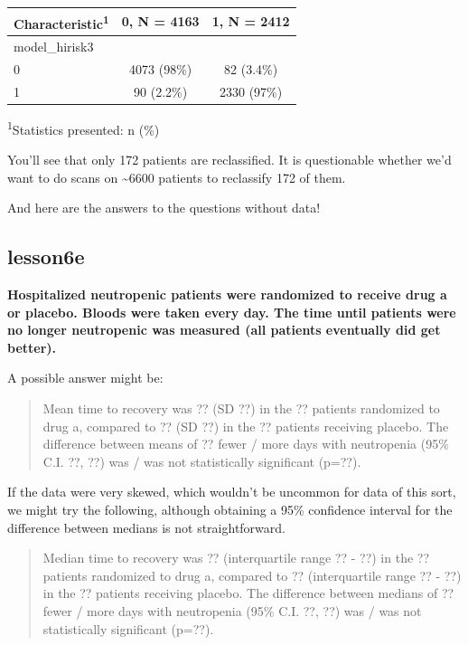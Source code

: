 \documentclass[]{book}
\begin{document}
\captionsetup[table]{labelformat=empty,skip=1pt}
\begin{longtable}{lcc}
\toprule
\textbf{Characteristic}\textsuperscript{1} & \textbf{0}, N = 4163 & \textbf{1}, N = 2412 \\ 
\midrule
model\_hirisk3 &  &  \\ 
0 & 4073 (98\%) & 82 (3.4\%) \\ 
1 & 90 (2.2\%) & 2330 (97\%) \\ 
\bottomrule
\end{longtable}
\vspace{-5mm}
\begin{minipage}{\linewidth}
\textsuperscript{1}Statistics presented: n (\%) \\ 
\end{minipage}

You'll see that only 172 patients are reclassified. It is questionable
whether we'd want to do scans on \textasciitilde6600 patients to
reclassify 172 of them.

And here are the answers to the questions without data!

\hypertarget{lesson6e}{%
\subsection{lesson6e}\label{lesson6e}}

\textbf{Hospitalized neutropenic patients were randomized to receive
drug a or placebo. Bloods were taken every day. The time until patients
were no longer neutropenic was measured (all patients eventually did get
better).}

A possible answer might be:

\begin{quote}
Mean time to recovery was ?? (SD ??) in the ?? patients randomized to
drug a, compared to ?? (SD ??) in the ?? patients receiving placebo. The
difference between means of ?? fewer / more days with neutropenia (95\%
C.I. ??, ??) was / was not statistically significant (p=??).
\end{quote}

If the data were very skewed, which wouldn't be uncommon for data of
this sort, we might try the following, although obtaining a 95\%
confidence interval for the difference between medians is not
straightforward.

\begin{quote}
Median time to recovery was ?? (interquartile range ?? - ??) in the ??
patients randomized to drug a, compared to ?? (interquartile range ?? -
??) in the ?? patients receiving placebo. The difference between medians
of ?? fewer / more days with neutropenia (95\% C.I. ??, ??) was / was
not statistically significant (p=??).
\end{quote}
\end{document}
